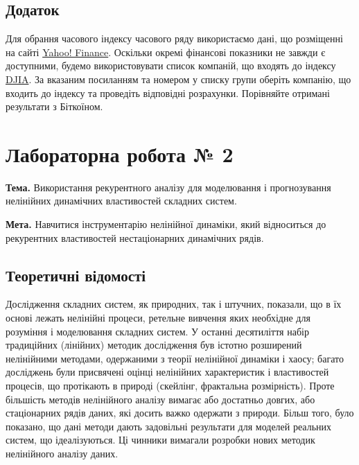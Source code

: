 \documentclass[
  letterpaper,
]{report}
\begin{document}
\hypertarget{ux434ux43eux434ux430ux442ux43eux43a}{%
\section{Додаток}\label{ux434ux43eux434ux430ux442ux43eux43a}}

Для обрання часового індексу часового ряду використаємо дані, що
розміщенні на сайті \href{https://finance.yahoo.com}{Yahoo! Finance}.
Оскільки окремі фінансові показники не завжди є доступними, будемо
використовувати список компаній, що входять до індексу
\href{https://en.wikipedia.org/wiki/Dow_Jones_Industrial_Average}{DJIA}.
За вказаним посиланням та номером у списку групи оберіть компанію, що
входить до індексу та проведіть відповідні розрахунки. Порівняйте
отримані результати з Біткоїном.


\hypertarget{ux43bux430ux431ux43eux440ux430ux442ux43eux440ux43dux430-ux440ux43eux431ux43eux442ux430-2}{%
\chapter{Лабораторна робота №
2}\label{ux43bux430ux431ux43eux440ux430ux442ux43eux440ux43dux430-ux440ux43eux431ux43eux442ux430-2}}

\textbf{Тема.} Використання рекурентного аналізу для моделювання і
прогнозування нелінійних динамічних властивостей складних систем.

\textbf{Мета.} Навчитися інструментарію нелінійної динаміки, який
відноситься до рекурентних властивостей нестаціонарних динамічних рядів.

\hypertarget{ux442ux435ux43eux440ux435ux442ux438ux447ux43dux456-ux432ux456ux434ux43eux43cux43eux441ux442ux456-1}{%
\section{Теоретичні
відомості}\label{ux442ux435ux43eux440ux435ux442ux438ux447ux43dux456-ux432ux456ux434ux43eux43cux43eux441ux442ux456-1}}

Дослідження складних систем, як природних, так і штучних, показали, що в
їх основі лежать нелінійні процеси, ретельне вивчення яких необхідне для
розуміння і моделювання складних систем. У останні десятиліття набір
традиційних (лінійних) методик дослідження був істотно розширений
нелінійними методами, одержаними з теорії нелінійної динаміки і хаосу;
багато досліджень були присвячені оцінці нелінійних характеристик і
властивостей процесів, що протікають в природі (скейлінг, фрактальна
розмірність). Проте більшість методів нелінійного аналізу вимагає або
достатньо довгих, або стаціонарних рядів даних, які досить важко
одержати з природи. Більш того, було показано, що дані методи дають
задовільні результати для моделей реальних систем, що ідеалізуються. Ці
чинники вимагали розробки нових методик нелінійного аналізу даних.
\end{document}
